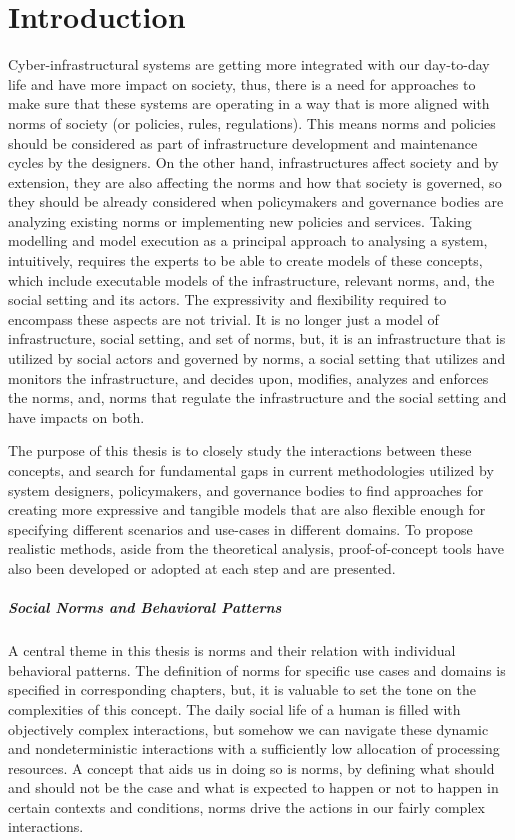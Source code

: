 \chapter{Introduction}
Cyber-infrastructural systems are getting more integrated with our day-to-day life and have more impact on society, thus, there is a need for approaches to make sure that these systems are operating in a way that is more aligned with norms of society (or policies, rules, regulations). This means norms and policies should be considered as part of infrastructure development and maintenance cycles by the designers. On the other hand, infrastructures affect society and by extension, they are also affecting the norms and how that society is governed, so they should be already considered when policymakers and governance bodies are analyzing existing norms or implementing new policies and services. Taking modelling and model execution as a principal approach to analysing a system, intuitively, requires the experts to be able to create models of these concepts, which include executable models of the infrastructure, relevant norms, and, the social setting and its actors. The expressivity and flexibility required to encompass these aspects are not trivial. It is no longer just a model of infrastructure, social setting, and set of norms, but, it is an infrastructure that is utilized by social actors and governed by norms, a social setting that utilizes and monitors the infrastructure, and decides upon, modifies, analyzes and enforces the norms, and, norms that regulate the infrastructure and the social setting and have impacts on both.


The purpose of this thesis is to closely study the interactions between these concepts, and search for fundamental gaps in current methodologies utilized by system designers, policymakers, and governance bodies to find approaches for creating more expressive and tangible models that are also flexible enough for specifying different scenarios and use-cases in different domains. To propose realistic methods, aside from the theoretical analysis, proof-of-concept tools have also been developed or adopted at each step and are presented.


\paragraph{Social Norms and Behavioral Patterns}
A central theme in this thesis is norms and their relation with individual behavioral patterns. The definition of norms for specific use cases and domains is specified in corresponding chapters, but, it is valuable to set the tone on the complexities of this concept. The daily social life of a human is filled with objectively complex interactions, but somehow we can navigate these dynamic and nondeterministic interactions with a sufficiently low allocation of processing resources. A concept that aids us in doing so is norms, by defining what should and should not be the case and what is expected to happen or not to happen in certain contexts and conditions, norms drive the actions in our fairly complex interactions. 


